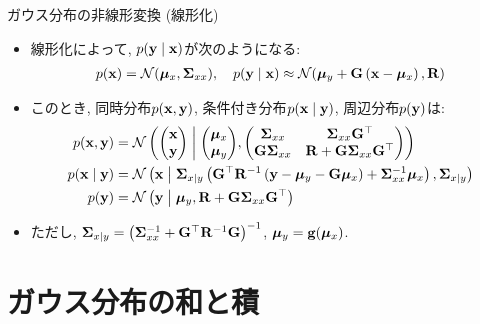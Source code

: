 \documentclass[dvipdfmx,notheorems,t]{beamer}
\begin{document}
\begin{frame}{ガウス分布の非線形変換 (線形化)}
\begin{itemize}
  \item 線形化によって, $p(\vb{y} \mid \vb{x})$が次のようになる:
  \begin{align*}
    p(\vb{x}) = \mathcal{N}(\vb*{\mu}_x, \vb{\Sigma}_{xx}), \quad
    p(\vb{y} \mid \vb{x}) \approx \mathcal{N}(\vb*{\mu}_y + \vb{G} \left( \vb{x} - \vb*{\mu}_x \right), \vb{R})
  \end{align*}
  \item このとき, 同時分布$p(\vb{x}, \vb{y})$, 条件付き分布$p(\vb{x} \mid \vb{y})$, 周辺分布$p(\vb{y})$は:
  \begin{align*}
    p(\vb{x}, \vb{y}) &= \mathcal{N} \left( \mqty(\vb{x} \\ \vb{y}) \middlerel|
      \mqty(\vb*{\mu}_x \\ \vb*{\mu}_y),
      \mqty(\vb{\Sigma}_{xx} & \vb{\Sigma}_{xx} \vb{G}^\top \\
      \vb{G} \vb{\Sigma}_{xx} & \vb{R} + \vb{G} \vb{\Sigma}_{xx} \vb{G}^\top) \right) \\
    p(\vb{x} \mid \vb{y}) &= \mathcal{N} \left( \vb{x} \middlerel|
      \vb{\Sigma}_{x \mid y}
      \left( \vb{G}^\top \vb{R}^{-1} \left( \vb{y} - \vb*{\mu}_y - \vb{G} \vb*{\mu}_x \right)
      + \vb{\Sigma}_{xx}^{-1} \vb*{\mu}_x \right),
      \vb{\Sigma}_{x \mid y} \right) \\
    p(\vb{y}) &= \mathcal{N} \left(\vb{y} \middlerel|
      \vb*{\mu}_y, \vb{R} + \vb{G} \vb{\Sigma}_{xx} \vb{G}^\top \right)
  \end{align*}
  \item ただし, $\vb{\Sigma}_{x \mid y} = \left( \vb{\Sigma}_{xx}^{-1} + \vb{G}^\top \vb{R}^{-1} \vb{G} \right)^{-1}$,
  $\vb*{\mu}_y = \vb{g}(\vb*{\mu}_x)$.
\end{itemize}
\end{frame}

\section{ガウス分布の和と積}
\end{document}
